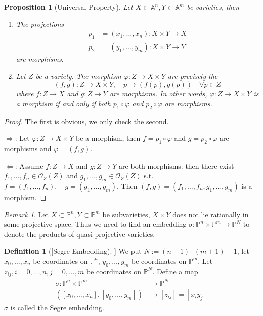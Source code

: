 \documentclass{amsart}
\theoremstyle{plain}
\newtheorem{proposition}{Proposition}
\theoremstyle{definition}
\newtheorem{definition}{Definition}
\theoremstyle{remark}
\newtheorem*{remark}{Remark}
\numberwithin{equation}{section}
\begin{document}
\begin{proposition}[Universal Property]\label{19}
	Let $ X\subset\mathbb{A}^n,Y \subset \mathbb{A}^m$ be varieties, then  
	\begin{enumerate}
		\item The projections
		\begin{align*}
			p_1 & =(x_1,\dots,x_n): X\times Y\to X\\
			p_2 & =(y_1,\dots,y_m): X\times Y\to Y
		\end{align*}
		are morphisms.
		\item Let $ Z $ be a variety. The morphism $ \varphi : Z\to X \times Y $ are precisely the 
		\begin{equation*}
		(f,g):Z\to X\times Y,\quad p\to (f(p),g(p))\quad\forall p\in Z
		\end{equation*}
		where $ f:Z\to X $ and $ g:Z\to Y $ are morphisms. In other words, $ \varphi:Z\to X\times Y $ is a morphism if and only if both $ p_1\circ \varphi $ and $ p_2\circ\varphi  $ are morphisms.
	\end{enumerate}
\end{proposition}
\begin{proof}
	The first is obvious, we only check the second.
	
	$ \Rightarrow $: Let $ \varphi:Z\to X\times Y $ be a morphism, then $ f=p_1\circ\varphi $ and $ g=p_2\circ\varphi $ are morphisms and $ \varphi=(f,g) $.
	
	$ \Leftarrow $: Assume $ f:Z\to X $ and $ g:Z\to Y $ are both morphisms. then there exist $ f_1,\dots,f_n\in \mathcal{O}_Z(Z) $ and $ g_1,\dots,g_m\in \mathcal{O}_Z(Z) $ s.t.
	$ f=(f_1,\dots,f_n),\quad g=(g_1,\dots,g_m) $. Then $ (f,g)=(f_1,\dots,f_n,g_1,\dots,g_m) $ is a morphism.
\end{proof}
\begin{remark}
	Let $ X\subset \mathbb{P}^n,Y\subset \mathbb{P}^m $ be subvarieties, $ X\times Y $ does not lie rationally in some projective space. Thus we need to find an embedding $ \sigma :\mathbb{P}^n\times \mathbb{P}^m \to \mathbb{P}^N$ to denote the products of quasi-projective varieties.
\end{remark}
\begin{definition}[[Segre Embedding]]
	We put $ N:=(n+1)\cdot (m+1)-1 $, let $ x_0,\dots,x_n $ be coordinates on $ \mathbb{P}^n $, $ y_0,\dots,y_m $ be coordinates on $ \mathbb{P}^m $. Let $ z_{ij}, i=0,\dots,n, j=0,\dots,m $ be coordinates on $ \mathbb{P}^N $. Define a map
	\begin{align*}
	\sigma:\mathbb{P}^n\times \mathbb{P}^m & \to  \mathbb{P}^N\\
	([x_0,\dots,x_n],[y_0,\dots,y_m]) & \to  [z_{ij}]=[x_iy_j]
	\end{align*}
	$ \sigma $ is called the Segre embedding.
\end{definition}
\end{document}
